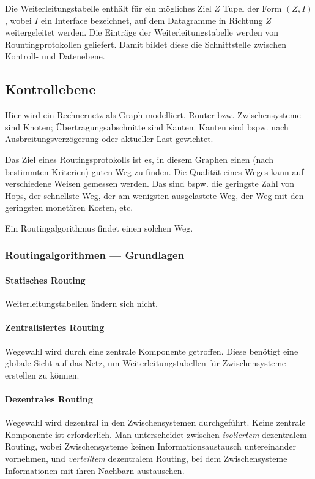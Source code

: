 \documentclass[a4paper, 14pt]{article}
\begin{document}
	Die Weiterleitungstabelle enthält für ein mögliches Ziel $Z$ Tupel der Form $(Z, I)$, wobei $I$ ein Interface bezeichnet, auf dem Datagramme in Richtung $Z$ weitergeleitet werden.
	Die Einträge der Weiterleitungstabelle werden von Rountingprotokollen geliefert.
	Damit bildet diese die Schnittstelle zwischen Kontroll- und Datenebene.

	\subsection{Kontrollebene}

	Hier wird ein Rechnernetz als Graph modelliert.
	Router bzw. Zwischensysteme sind Knoten; Übertragungsabschnitte sind Kanten.
	Kanten sind bspw. nach Ausbreitungsverzögerung oder aktueller Last gewichtet.

	Das Ziel eines Routingsprotokolls ist es, in diesem Graphen einen (nach bestimmten Kriterien) guten Weg zu finden.
	Die Qualität eines Weges kann auf verschiedene Weisen gemessen werden.
	Das sind bspw. die geringste Zahl von Hops, der schnellste Weg, der am wenigsten ausgelastete Weg, der Weg mit den geringsten monetären Kosten, etc.

	Ein Routingalgorithmus findet einen solchen Weg.

	\subsubsection{Routingalgorithmen --- Grundlagen}

	\paragraph{Statisches Routing}

	Weiterleitungstabellen ändern sich nicht.

	\paragraph{Zentralisiertes Routing}

	Wegewahl wird durch eine zentrale Komponente getroffen.
	Diese benötigt eine globale Sicht auf das Netz, um Weiterleitungstabellen für Zwischensysteme erstellen zu können.

	\paragraph{Dezentrales Routing}

	Wegewahl wird dezentral in den Zwischensystemen durchgeführt.
	Keine zentrale Komponente ist erforderlich.
	Man unterscheidet zwischen \emph{isoliertem} dezentralem Routing, wobei Zwischensysteme keinen Informationsaustausch untereinander vornehmen, und \emph{verteiltem} dezentralem Routing, bei dem Zwischensysteme Informationen mit ihren Nachbarn austauschen.
\end{document}
